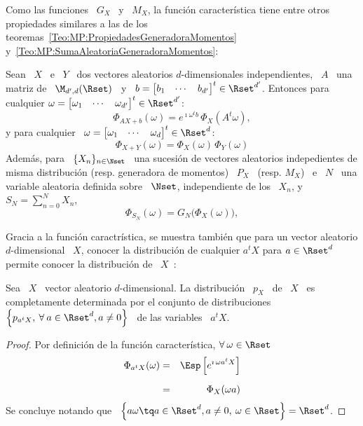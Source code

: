 {Como las  funciones \  $G_X$ \  y \ $M_X$,  la funci\'on  caracter\'istica tiene
entre      otros      propiedades      similares      a     las      de      los
teoremas~\ref{Teo:MP:PropiedadesGeneradoraMomentos}
y~\ref{Teo:MP:SumaAleatoriaGeneradoraMomentos}:
%
\begin{teorema}%
\label{Teo:MP:PropiedadesFuncionCaracteristica}
%
  Sean  \   $X$  \  e  \   $Y$  \  dos   vectores  aleatorios  $d$-dimensionales
  independientes,  \ $A$  \ una  matriz de  \  $\M_{d',d}(\Rset)$ \  y \  $b
  =  \begin{bmatrix} b_1  &  \cdots &  b_{d'}  \end{bmatrix}^t \in  \Rset^{d'}$.
  Entonces  para  cualquier  $\omega  =  \begin{bmatrix}  \omega_1  &  \cdots  &
    \omega_{d'} \end{bmatrix}^t \in \Rset^{d'}$:
  \[
  \Phi_{A X + b}(\omega) =  e^{\imath \omega^t b} \, \Phi_X\left( A^t \omega \right),
  \]
  y   para   cualquier \  $\omega   =   \begin{bmatrix}   \omega_1   &  \cdots   &
    \omega_d \end{bmatrix}^t \in \Rset^d$:
  \[
  \Phi_{X+Y}(\omega) = \Phi_X(\omega) \, \Phi_Y(\omega)
  \]
  Adem\'as,  para \  $\{ X_n  \}_{n \in  \Nset}$ \,  una sucesi\'on  de vectores
  aleatorios  indepedientes  de   misma  distribuci\'on  (resp.   generadora  de
  momentos) \ $P_X$ \ (resp. $M_X$) \  e \ $N$ \ una variable aleatoria definida
  sobre \ $\Nset$, independiente de los \ $X_n$, y \ $ S_N = \sum_{n=0}^N X_n$,
  \[
  \Phi_{S_N}(\omega) =  G_N \big( \Phi_X(\omega) \big),
  \]
\end{teorema}

Gracia a la  funci\'on caractr\'istica, se muestra tambi\'en  que para un vector
aleatorio $d$-dimensional \ $X$, conocer  la distribuci\'on de cualquier $a^t X$
para $a  \in \Rset^d$  permite conocer la  distribuci\'on de  \ $X$~\cite{Mui82,
  Sas13}:
%
\begin{teorema}
  Sea \ $X$ \ vector aleatorio $d$-dimensional. La distribuci\'on \ $p_X$ \ de \
  $X$  \  es completamente  determinada  por  el  conjunto de  distribuciones  \
  $\left\{ p_{a^t X},  \: \forall \: a \in  \Rset^d, a \ne 0 \right\}$  \ de las
  variables \ $a^t X$.
\end{teorema}
%
\begin{proof}
  Por definici\'on  de la funci\'on caracter\'istica, $\forall \: \omega \in \Rset$
  \begin{eqnarray*}
  \Phi_{a^t X}(\omega) & = & \Esp\left[ e^{\imath \, \omega a^t X} \right]\\[2mm]
  & = & \Phi_X(\omega a)
  \end{eqnarray*}
  Se concluye  notando que \ $\left\{  a \omega \tq a  \in \Rset^d, a  \ne 0, \:
    \omega \in \Rset \right\} = \Rset^d$.
\end{proof}

}
